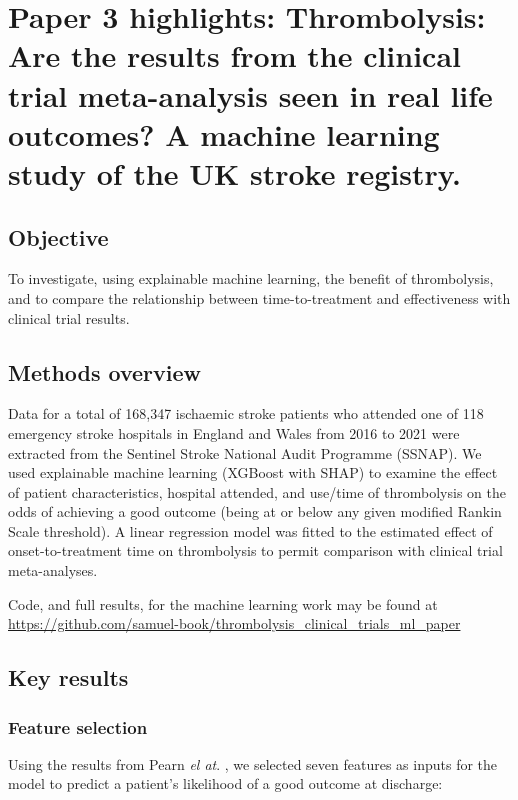 \section{Paper 3 highlights: Thrombolysis: Are the results from the clinical trial meta-analysis seen in real life outcomes?  A machine learning study of the UK stroke registry.\cite{pearn_are_2024}}\label{sec:paper_3}

\subsection{Objective}

To investigate, using explainable machine learning, the benefit of thrombolysis, and to compare the relationship between time-to-treatment and effectiveness with clinical trial results.

\subsection{Methods overview}

Data for a total of 168,347 ischaemic stroke patients who attended one of 118 emergency stroke hospitals in England and Wales from 2016 to 2021 were extracted from the Sentinel Stroke National Audit Programme (SSNAP). We used explainable machine learning (XGBoost\cite{chen_xgboost_2016} with SHAP\cite{lundberg_unified_2017}) to examine the effect of patient characteristics, hospital attended, and use/time of thrombolysis on the odds of achieving a good outcome (being at or below any given modified Rankin Scale threshold). A linear regression model was fitted to the estimated effect of onset-to-treatment time on thrombolysis to permit comparison with clinical trial meta-analyses.

Code, and full results, for the machine learning work may be found at \url{https://github.com/samuel-book/thrombolysis_clinical_trials_ml_paper}

\subsection{Key results}

\subsubsection{Feature selection}

Using the results from Pearn \textit{el at}. \cite{pearn_are_2024}, we selected seven features as inputs for the model to predict a patient's likelihood of a good outcome at discharge:

